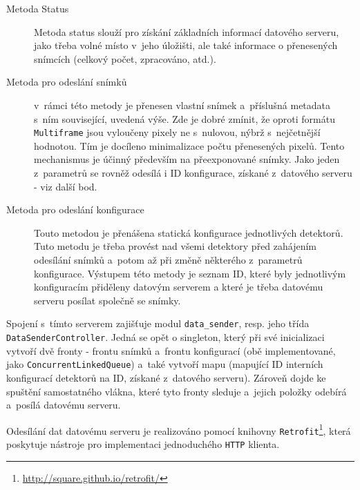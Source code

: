 \begin{description}
	\item[Metoda Status] Metoda status slouží pro získání základních informací datového serveru, jako třeba volné místo v~jeho úložišti, ale také informace o přenesených snímcích (celkový počet, zpracováno, atd.).
	\item[Metoda pro odeslání snímků] v~rámci této metody je přenesen vlastní snímek a~příslušná metadata s~ním související, uvedená výše. Zde je dobré zmínit, že oproti formátu \texttt{Multiframe} jsou vyloučeny pixely ne s~nulovou, nýbrž s~nejčetnější hodnotou. Tím je docíleno minimalizace počtu přenesených pixelů. Tento mechanismus je účinný především na přeexponované snímky. Jako jeden z~parametrů se rovněž odesílá i ID konfigurace, získané z~datového serveru - viz další bod.
	\item[Metoda pro odeslání konfigurace] Touto metodou je přenášena statická konfigurace jednotlivých detektorů. Tuto metodu je třeba provést nad všemi detektory před zahájením odesílání snímků a~potom až při změně některého z~parametrů konfigurace. Výstupem této metody je seznam ID, které byly jednotlivým konfiguracím přiděleny datovým serverem a které je třeba datovému serveru posílat společně se snímky.
\end{description}

Spojení s~tímto serverem zajišťuje modul \texttt{data\_sender}, resp. jeho třída \texttt{DataSenderController}. Jedná se opět o singleton, který při své inicializaci vytvoří dvě fronty - frontu snímků a~frontu konfigurací (obě implementované, jako \texttt{ConcurrentLinkedQueue}) a~také vytvoří mapu (mapující ID interních konfigurací detektorů na ID, získané z~datového serveru). Zároveň dojde ke spuštění samostatného vlákna, které tyto fronty sleduje a~jejich položky odebírá a~posílá datovému serveru.

Odesílání dat datovému serveru je realizováno pomocí knihovny \texttt{Retrofit}\footnote{\url{http://square.github.io/retrofit/}}, která poskytuje nástroje pro implementaci jednoduchého \texttt{HTTP} klienta.









